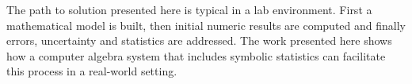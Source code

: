 The path to solution presented here is typical in a lab environment. First a mathematical model is built, then initial numeric results are computed and finally errors, uncertainty and statistics are addressed. The work presented here shows how a computer algebra system that includes symbolic statistics can facilitate this process in a real-world setting.
